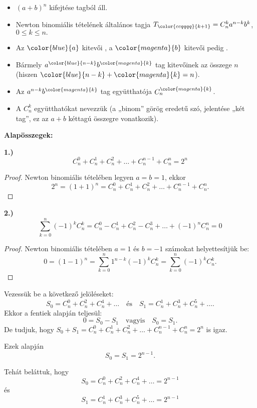 \begin{itemize}
\item $(a+b)^{n}$ kifejtése {\color{ccqqqq}{$n+1$}} tagból áll. 
\item Newton binomiális tételének általános tagja $T_{{\color{ccqqqq}{k+1}}}=C_{n}^{k}a^{n-k}b^{k}$,
$0\leq k\leq n.$ 
\item Az ${\color{blue}{a}}$ kitevői {\color{blue}{$n$-től $0$-ig
csökkennek}}, a ${\color{magenta}{b}}$ kitevői pedig {\color{magenta}{$0$-tól
$n$-ig növekednek}}. 
\item Bármely $a^{{\color{blue}{n-k}}}b^{{\color{magenta}{k}}}$ tag kitevőinek
az összege $n$ (hiszen ${\color{blue}{n-k}}+{\color{magenta}{k}}=n$). 
\item Az $a^{n-k}b^{{\color{magenta}{k}}}$ tag együtthatója $C_{n}^{{\color{magenta}{k}}}$. 
\item A $C_{n}^{k}$ együtthatókat {\color{ccqqqq}{binomiális együtthatóknak}}
nevezzük (a „binom” görög eredetű szó, jelentése „két tag”, ez az
$a+b$ kéttagú összegre vonatkozik). 
\end{itemize}
\vspace{0.3cm}

\textbf{Alapösszegek:}

\textbf{1.)} 
\[
\boxed{C_{n}^{0}+C_{n}^{1}+C_{n}^{2}+\ldots+C_{n}^{n-1}+C_{n}^{n}=2^{n}}
\]

\begin{proof}
Newton binomiális tételében legyen $a=b=1$, ekkor 
\[
2^{n}=(1+1)^{n}=C_{n}^{0}+C_{n}^{1}+C_{n}^{2}+\ldots+C_{n}^{n-1}+C_{n}^{n}.
\]
\end{proof}
\textbf{2.)} 
\[
\boxed{\sum_{k=0}^{n}(-1)^{k}C_{n}^{k}=C_{n}^{0}-C_{n}^{1}+C_{n}^{2}-C_{n}^{3}+\ldots+(-1)^{n}C_{n}^{n}=0}
\]

\begin{proof}
Newton binomiális tételében $a=1$ és $b=-1$ számokat helyettesítjük
be: 
\[
0=(1-1)^{n}=\sum_{k=0}^{n}1^{n-k}(-1)^{k}C_{n}^{k}=\sum_{k=0}^{n}(-1)^{k}C_{n}^{k}.
\]
\end{proof}
Vezessük be a következő jelöléseket: 
\[
S_{0}=C_{n}^{0}+C_{n}^{2}+C_{n}^{4}+\ldots\quad\text{és}\quad S_{1}=C_{n}^{1}+C_{n}^{3}+C_{n}^{5}+\ldots.
\]
Ekkor a fentiek alapján teljesül: 
\[
0=S_{0}-S_{1}\quad\text{vagyis}\quad S_{0}=S_{1}.
\]
De tudjuk, hogy $S_{0}+S_{1}=C_{n}^{0}+C_{n}^{1}+C_{n}^{2}+\ldots+C_{n}^{n-1}+C_{n}^{n}=2^{n}$
is igaz.

Ezek alapján 
\[
S_{0}=S_{1}=2^{n-1}.
\]

Tehát beláttuk, hogy 
\[
\boxed{S_{0}=C_{n}^{0}+C_{n}^{2}+C_{n}^{4}+\ldots=2^{n-1}}
\]
és 
\[
\boxed{S_{1}=C_{n}^{1}+C_{n}^{3}+C_{n}^{5}+\ldots=2^{n-1}}
\]

